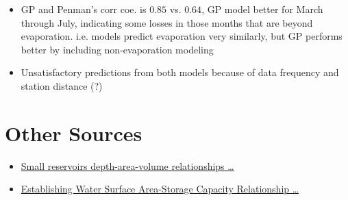 \documentclass{article}
\begin{document}
\begin{itemize}
    \item GP and Penman’s corr coe. is $0.85$ vs. $0.64$, GP model better for March through July, indicating some losses in those months that are beyond evaporation. i.e. models predict evaporation very similarly, but GP performs better by including non-evaporation modeling
    \item Unsatisfactory predictions from both models because of data frequency and station distance (?)
\end{itemize}

\newpage

\section{Other Sources}

\begin{itemize}
    \item \href{https://core.ac.uk/download/pdf/270268124.pdf}{Small reservoirs depth-area-volume relationships …}
    \item \href{https://www.sciencedirect.com/science/article/pii/S1876610212001968?fr=RR-1&ref=cra_js_challenge}{Establishing Water Surface Area-Storage Capacity Relationship …}
\end{itemize}
\end{document}
